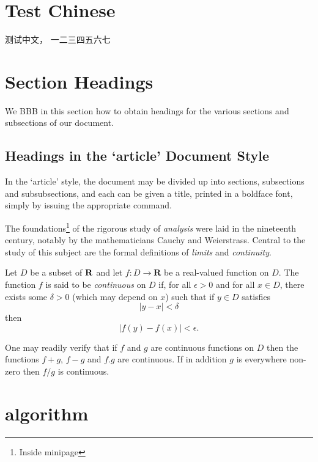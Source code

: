 \section{Test Chinese}
测试中文， 一二三四五六七
\section{Section Headings}
We \citep{Ancey1996} BBB \citep{RR73} in this section how to obtain headings
for the various sections and subsections of our
document.
\subsection{Headings in the ‘article’ Document Style}
In the ‘article’ style, the document may be divided up
into sections, subsections and subsubsections, and each
can be given a title, printed in a boldface font,
simply by issuing the appropriate command.

The foundations\footnote{Inside minipage} of the rigorous study of \textit{analysis}
were laid in the nineteenth century, notably by the
mathematicians Cauchy and Weierstrass. Central to the
study of this subject are the formal definitions of
\textit{limits} and \textit{continuity}.

Let $D$ be a subset of $\bf R$ and let
$f \colon D \to \textbf{R}$ be a real-valued function on
$D$. The function $f$ is said to be \textit{continuous} on
$D$ if, for all $\epsilon > 0$ and for all $x \in D$,
there exists some $\delta > 0$ (which may depend on $x$)
such that if $y \in D$ satisfies
\[ |y - x| < \delta \]
then
\[ |f(y) - f(x)| < \epsilon. \]

One may readily verify that if $f$ and $g$ are continuous
functions on $D$ then the functions $f+g$, $f-g$ and
$f.g$ are continuous. If in addition $g$ is everywhere
non-zero then $f/g$ is continuous.

\section{algorithm}

